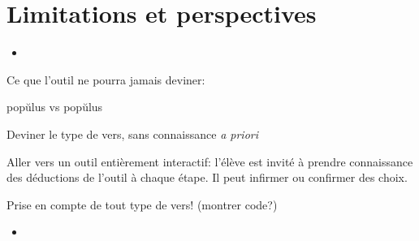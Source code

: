 \documentclass{beamer}
\newcommand\overtxt[2]{\makebox[0cm][l]{\color{diacrit}#1}#2}
\newcommand\hlbr{\overtxt{\u~}}
\newcommand\hllg{\overtxt{\=~}}
\begin{document}
\section{Limitations et perspectives}


\begin{frame}{}

\begin{itemize}
\item
\end{itemize}

Ce que l'outil ne pourra jamais deviner:

p\hlbr{o}p\u{u}lus vs p\hllg{o}p\u{u}lus

Deviner le type de vers, sans connaissance \emph{a priori}

Aller vers un outil entièrement interactif: l'élève est invité à prendre connaissance des déductions de l'outil à chaque étape. Il peut infirmer ou confirmer des choix.

Prise en compte de tout type de vers! (montrer code?)

\end{frame} %





\begin{frame}{}

\begin{itemize}
\item
\end{itemize}
\end{frame} %
\end{document}
